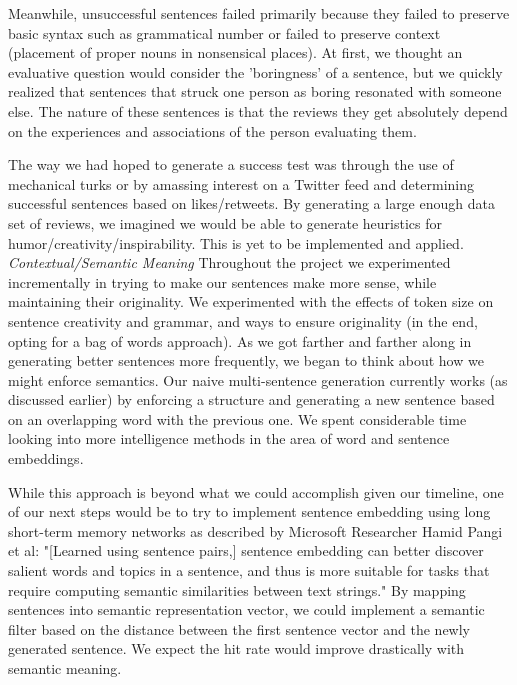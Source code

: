 \documentclass[11pt]{article}
\begin{document}
Meanwhile, unsuccessful sentences failed primarily because they failed to preserve basic syntax such as grammatical number or failed to preserve context (placement of proper nouns in nonsensical places). At first, we thought an evaluative question would consider the 'boringness' of a sentence, but we quickly realized that sentences that struck one person as boring resonated with someone else. The nature of these sentences is that the reviews they get absolutely depend on the experiences and associations of the person evaluating them. 

The way we had hoped to generate a success test was through the use of mechanical turks or by amassing interest on a Twitter feed and determining successful sentences based on likes/retweets. By generating a large enough data set of reviews, we imagined we would be able to generate heuristics for humor/creativity/inspirability. This is yet to be implemented and applied. 
\newline
\textit{Contextual/Semantic Meaning }
\newline
Throughout the project we experimented incrementally in trying to make our sentences make more sense, while maintaining their originality. We experimented with the effects of token size on sentence creativity and grammar, and ways to ensure originality (in the end, opting for a bag of words approach). As we got farther and farther along in generating better sentences more frequently, we began to think about how we might enforce semantics. Our naive multi-sentence generation currently works (as discussed earlier) by enforcing a structure and generating a new sentence based on an overlapping word with the previous one. We spent considerable time looking into more intelligence methods in the area of word and sentence embeddings.

While this approach is beyond what we could accomplish given our timeline, one of our next steps would be to try to implement sentence embedding using long short-term memory networks as described by Microsoft Researcher Hamid Pangi et al:
"[Learned using sentence pairs,] sentence embedding can better discover salient words and topics in a sentence, and thus is more suitable for tasks that require computing semantic similarities between text strings."\cite{palangi2015} By mapping sentences into semantic representation vector, we could implement a semantic filter based on the distance between the first sentence vector and the newly generated sentence. We expect the hit rate would improve drastically with semantic meaning. 
\end{document}
